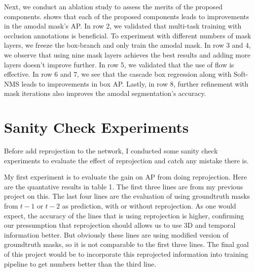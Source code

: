 Next, we conduct an ablation study to assess the merits of the proposed components.   shows that each of the proposed components leads to improvements in the amodal mask's AP.
In row 2, we validated that multi-task training with occlusion annotations is beneficial. 
To experiment with different numbers of mask layers, we freeze the box-branch and only train the amodal mask.
In row 3 and 4, we observe that using nine mask layers achieves the best results and adding more layers doesn't improve further. In row 5, we validated that the use of flow is effective. 
In row 6 and 7, we see that the cascade box regression along with Soft-NMS leads to improvements in box AP. Lastly, in row 8, further refinement with mask iterations also improves the amodal segmentation's accuracy.





\section{Sanity Check Experiments}
Before add reprojection to the network, I conducted some sanity check experiments to evaluate the effect of reprojection and catch any mistake there is. 

My first experiment is to evaluate the gain on AP from doing reprojection. Here are the quantative results in table 1. The first three lines are from my previous project on this. The last four lines are the evaluation of using groundtruth masks from $t-1$ or $t-2$ as prediction, with or without reprojection. As one would expect, the accuracy of the lines that is using reprojection is higher, confirming our pressumption that reprojection should allows us to use 3D and temporal information better. But obviously these lines are using modified version of groundtruth masks, so it is not comparable to the first three lines. The final goal of this project would be to incorporate this reprojected information into training pipeline to get numbers better than the third line.

